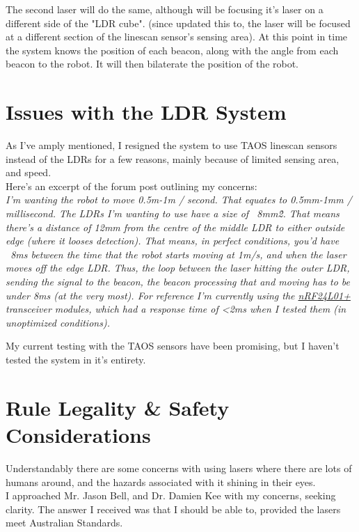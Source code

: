				The second laser will do the same, although will be focusing it's laser on a different side of the "LDR cube". (since updated this to, the laser will be focused at a different section of the linescan sensor's sensing area). At this point in time the system knows the position of each beacon, along with the angle from each beacon to the robot. It will then bilaterate the position of the robot.
				
			\section{Issues with the LDR System}
				As I've amply mentioned, I resigned the system to use TAOS linescan sensors instead of the LDRs for a few reasons, mainly because of limited sensing area, and speed.\\
				
				Here's an excerpt of the forum post outlining my concerns:\\
				
				\textit{I'm wanting the robot to move 0.5m-1m / second. That equates to 0.5mm-1mm / millisecond. The LDRs I'm wanting to use have a size of ~8mm\^2. That means there's a distance of 12mm from the centre of the middle LDR to either outside edge (where it looses detection). That means, in perfect conditions, you'd have ~8ms between the time that the robot starts moving at 1m/s, and when the laser moves off the edge LDR. Thus, the loop between the laser hitting the outer LDR, sending the signal to the beacon, the beacon processing that and moving has to be under 8ms (at the very most). For reference I'm currently using the \hyperref[sec:nRF24L01+]{nRF24L01+} transceiver modules, which had a response time of <2ms when I tested them (in unoptimized conditions).}
				
				My current testing with the TAOS sensors have been promising, but I haven't tested the system in it's entirety. 
							
			\section{Rule Legality \& Safety Considerations}
				Understandably there are some concerns with using lasers where there are lots of humans around, and the hazards associated with it shining in their eyes.\\
				
				I approached Mr. Jason Bell, and Dr. Damien Kee with my concerns, seeking clarity. The answer I received was that I should be able to, provided the lasers meet Australian Standards.\\
				
